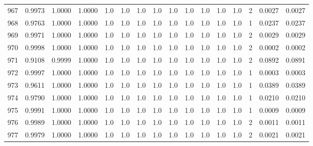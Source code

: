 \begin{tabular}{lrrrrrrrrrrrrrrr}
967 &      0.9973 &  1.0000 &  1.0000 &     1.0 &     1.0 &     1.0 &     1.0 &     1.0 &     1.0 &     1.0 &      1.0 &        1.0 &      2 &                    0.0027 &                     0.0027 \\
968 &      0.9763 &  1.0000 &  1.0000 &     1.0 &     1.0 &     1.0 &     1.0 &     1.0 &     1.0 &     1.0 &      1.0 &        1.0 &      1 &                    0.0237 &                     0.0237 \\
969 &      0.9971 &  1.0000 &  1.0000 &     1.0 &     1.0 &     1.0 &     1.0 &     1.0 &     1.0 &     1.0 &      1.0 &        1.0 &      2 &                    0.0029 &                     0.0029 \\
970 &      0.9998 &  1.0000 &  1.0000 &     1.0 &     1.0 &     1.0 &     1.0 &     1.0 &     1.0 &     1.0 &      1.0 &        1.0 &      2 &                    0.0002 &                     0.0002 \\
971 &      0.9108 &  0.9999 &  1.0000 &     1.0 &     1.0 &     1.0 &     1.0 &     1.0 &     1.0 &     1.0 &      1.0 &        1.0 &      2 &                    0.0892 &                     0.0891 \\
972 &      0.9997 &  1.0000 &  1.0000 &     1.0 &     1.0 &     1.0 &     1.0 &     1.0 &     1.0 &     1.0 &      1.0 &        1.0 &      1 &                    0.0003 &                     0.0003 \\
973 &      0.9611 &  1.0000 &  1.0000 &     1.0 &     1.0 &     1.0 &     1.0 &     1.0 &     1.0 &     1.0 &      1.0 &        1.0 &      1 &                    0.0389 &                     0.0389 \\
974 &      0.9790 &  1.0000 &  1.0000 &     1.0 &     1.0 &     1.0 &     1.0 &     1.0 &     1.0 &     1.0 &      1.0 &        1.0 &      1 &                    0.0210 &                     0.0210 \\
975 &      0.9991 &  1.0000 &  1.0000 &     1.0 &     1.0 &     1.0 &     1.0 &     1.0 &     1.0 &     1.0 &      1.0 &        1.0 &      1 &                    0.0009 &                     0.0009 \\
976 &      0.9989 &  1.0000 &  1.0000 &     1.0 &     1.0 &     1.0 &     1.0 &     1.0 &     1.0 &     1.0 &      1.0 &        1.0 &      2 &                    0.0011 &                     0.0011 \\
977 &      0.9979 &  1.0000 &  1.0000 &     1.0 &     1.0 &     1.0 &     1.0 &     1.0 &     1.0 &     1.0 &      1.0 &        1.0 &      2 &                    0.0021 &                     0.0021 \\

\end{tabular}
